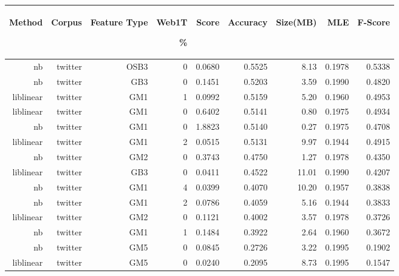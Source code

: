 \begin{table}[htbp!]
	\begin{center}
		\begin{tabular}{ | r | r | r | r | r | r | r | r| r | }
			\hline
			\begin{sideways}Method\end{sideways} & \begin{sideways}Corpus\end{sideways} & \begin{sideways}Feature Type\end{sideways} & \begin{sideways}Web1T\end{sideways} \% & \begin{sideways}Score\end{sideways} & \begin{sideways}Accuracy\end{sideways} & \begin{sideways}Size(MB)\end{sideways} &\begin{sideways}MLE\end{sideways} & \begin{sideways}F-Score\end{sideways}\\ \hline

nb & twitter & OSB3 & 0 & 0.0680 & 0.5525 & 8.13 & 0.1978 & 0.5338\\ \hline 
nb & twitter & GB3 & 0 & 0.1451 & 0.5203 & 3.59 & 0.1990 & 0.4820\\ \hline 
liblinear & twitter & GM1 & 1 & 0.0992 & 0.5159 & 5.20 & 0.1960 & 0.4953\\ \hline 
liblinear & twitter & GM1 & 0 & 0.6402 & 0.5141 & 0.80 & 0.1975 & 0.4934\\ \hline 
nb & twitter & GM1 & 0 & 1.8823 & 0.5140 & 0.27 & 0.1975 & 0.4708\\ \hline 
liblinear & twitter & GM1 & 2 & 0.0515 & 0.5131 & 9.97 & 0.1944 & 0.4915\\ \hline 
nb & twitter & GM2 & 0 & 0.3743 & 0.4750 & 1.27 & 0.1978 & 0.4350\\ \hline 
liblinear & twitter & GB3 & 0 & 0.0411 & 0.4522 & 11.01 & 0.1990 & 0.4207\\ \hline 
nb & twitter & GM1 & 4 & 0.0399 & 0.4070 & 10.20 & 0.1957 & 0.3838\\ \hline 
nb & twitter & GM1 & 2 & 0.0786 & 0.4059 & 5.16 & 0.1944 & 0.3833\\ \hline 
liblinear & twitter & GM2 & 0 & 0.1121 & 0.4002 & 3.57 & 0.1978 & 0.3726\\ \hline 
nb & twitter & GM1 & 1 & 0.1484 & 0.3922 & 2.64 & 0.1960 & 0.3672\\ \hline 
nb & twitter & GM5 & 0 & 0.0845 & 0.2726 & 3.22 & 0.1995 & 0.1902\\ \hline 
liblinear & twitter & GM5 & 0 & 0.0240 & 0.2095 & 8.73 & 0.1995 & 0.1547\\ \hline 


\end{tabular}
\end{center}
\end{table}
